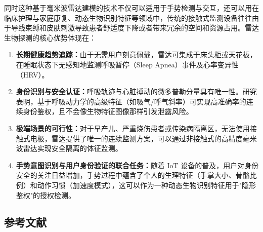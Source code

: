 同时这种基于毫米波雷达建模的技术不仅可以适用于手势检测与交互，还可以用在临床护理与家庭康复、动态生物识别特征等领域中，传统的接触式监测设备往往由于导线束缚和皮肤刺激导致患者舒适度下降或者带来冗余的空间和资源占用。雷达生物探测的核心优势体现在：
\begin{enumerate}
    \item \textbf{长期健康趋势追踪：}由于无需用户刻意佩戴，雷达可集成于床头柜或天花板，在睡眠状态下无感知地监测呼吸暂停（Sleep Apnea）事件及心率变异性（HRV）。
    \item \textbf{身份识别与安全认证：}呼吸轨迹与心脏搏动的微多普勒分量具有唯一性。研究表明，基于呼吸动力学的高级特征（如吸气/呼气斜率）可实现高准确率的连续身份鉴权，且不会像生物特征图像那样引发泄露风险。
    \item \textbf{极端场景的可行性：}对于早产儿、严重烧伤患者或传染病隔离区，无法使用接触式电极，雷达提供了唯一的连续监测方案，可以通过非接触式的高精度毫米波雷达实现安全隔离的体征监测。
    \item \textbf{手势意图识别与用户身份验证的联合任务：}随着 IoT 设备的普及，用户对身份安全的关注日益增加，手势过程中蕴含了个人的生理特征（手掌大小、骨骼比例）和动作习惯（加速度模式），这可以作为一种动态生物识别特征用于"隐形鉴权"的授权检测。
\end{enumerate}
{
\newpage

\subsection{参考文献}
{\normalfont{}\setlength{\baselineskip}{14pt}
\renewcommand{\refname}{\vspace{-\baselineskip}}
}
}

